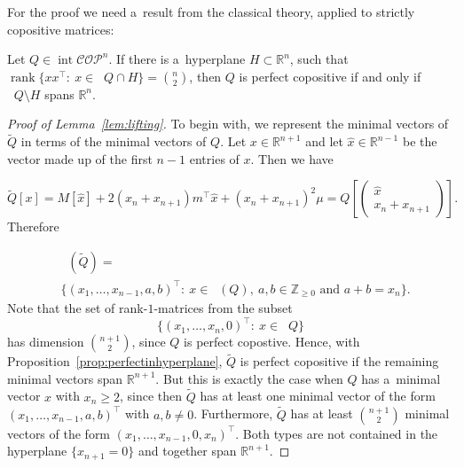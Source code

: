 \documentclass{commat}
\newcommand{\IZ}{{\mathbb{Z}}}
\newcommand{\IR}{{\mathbb{R}}}
\newcommand{\IRn}{\IR^n}
\DeclareMathOperator{\interior}{int}
\newcommand{\cop}{{\mathcal{COP}}}
\newcommand{\copn}{{\mathcal{COP}}^{n}}
\DeclareMathOperator{\MinC}{Min_{\cop}}
\begin{document}
For the proof we need a~result from the classical theory, applied to strictly copositive matrices:
\begin{proposition}\label{prop:perfectinhyperplane}
    Let \(Q\in\interior\copn \).
    If there is a~hyperplane \(H\subset \IRn \), such that
	\(\operatorname{rank}\{ xx^\intercal :\ x\in\MinC Q \cap H \}=\binom{n}{2} \),
	then $Q$ is perfect copositive if and only if \(\MinC Q \setminus H \) spans \(\IRn \).
\end{proposition}
\begin{proof}[Proof of Lemma~\ref{lem:lifting}]
	To begin with, we represent the minimal vectors of \(\widetilde{Q} \) in terms of the minimal
	vectors of $Q$.
	Let \(x\in\IR^{n+1} \) and let \(\hat{x}\in\IR^{n-1} \) be the vector made up of the first
	\(n-1 \) entries of $x$.
	Then we have
	
\[
	 \widetilde{Q}[x] = M[\hat{x}] + 2(x_n+x_{n+1})m^\intercal\hat{x} + {(x_n+x_{n+1})}^2 \mu
		= Q\left[
\begin{pmatrix}
\hat{x} \\ x_n + x_{n+1}
\end{pmatrix}
\right].
\]
	Therefore
	
\begin{align*}
		& \MinC(\widetilde{Q}) = \\
			& \big\{
			 {(x_1,\dots, x_{n-1}, a, b)}^\intercal :\
			 x\in\MinC(Q),\ a,b\in\IZ_{\geq0} \text{ and } a+b=x_n
			\big\}.
\end{align*}
    Note that the set of rank-$1$-matrices from the subset
    \[
        \big\{ {(x_1, \dots, x_n, 0)}^\intercal :\ x\in\MinC Q \big\}
    \]
    has dimension \(\binom{n+1}{2} \), since $Q$ is perfect copostive.
    Hence, with Proposition~\ref{prop:perfectinhyperplane}, \(\widetilde{Q} \) is perfect
    copositive if the remaining minimal vectors span \(\IR^{n+1} \).
	But this is exactly the case when $Q$ has a~minimal vector $x$ with \(x_n \geq 2 \), since
	then \(\widetilde{Q} \) has at least one minimal vector of the form
	\({(x_1, \dots, x_{n-1}, a, b)}^\intercal \) with \(a, b \neq 0 \).
	Furthermore, \(\widetilde{Q} \) has at least \(\binom{n+1}{2} \) minimal vectors of the form
	\({(x_1, \dots, x_{n-1}, 0, x_n)}^\intercal \).
	Both types are not contained in the hyperplane \(\{ x_{n+1} = 0 \} \) and together span
	\(\IR^{n+1} \).
\end{proof}
\end{document}
